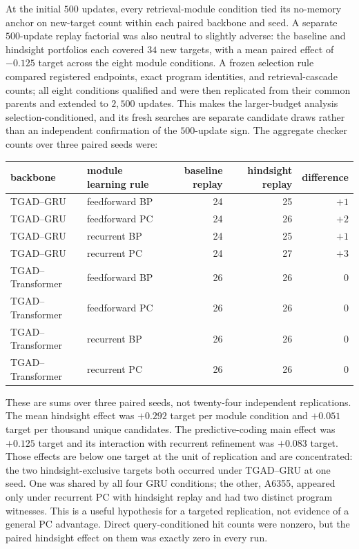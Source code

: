\documentclass[11pt]{article}
\begin{document}
At the initial $500$ updates, every retrieval-module condition tied its no-memory anchor
on new-target count within each paired backbone and seed.  A separate $500$-update replay
factorial was also neutral to slightly adverse: the baseline and hindsight portfolios
each covered $34$ new targets, with a mean paired effect of $-0.125$ target across the
eight module conditions.  A frozen selection rule compared registered endpoints, exact
program identities, and retrieval-cascade counts; all eight conditions qualified and were
then replicated from their common parents and extended to $2{,}500$ updates.  This makes
the larger-budget analysis selection-conditioned, and its fresh searches are separate
candidate draws rather than an independent confirmation of the $500$-update sign.  The
aggregate checker counts over three paired seeds were:

\begin{center}\small
\begin{tabular}{@{}llrrr@{}}
\toprule
backbone & module learning rule & baseline replay & hindsight replay & difference \\
\midrule
TGAD--GRU & feedforward BP & 24 & 25 & $+1$ \\
TGAD--GRU & feedforward PC & 24 & 26 & $+2$ \\
TGAD--GRU & recurrent BP & 24 & 25 & $+1$ \\
TGAD--GRU & recurrent PC & 24 & 27 & $+3$ \\
TGAD--Transformer & feedforward BP & 26 & 26 & $0$ \\
TGAD--Transformer & feedforward PC & 26 & 26 & $0$ \\
TGAD--Transformer & recurrent BP & 26 & 26 & $0$ \\
TGAD--Transformer & recurrent PC & 26 & 26 & $0$ \\
\bottomrule
\end{tabular}
\end{center}

These are sums over three paired seeds, not twenty-four independent replications.  The
mean hindsight effect was $+0.292$ target per module condition and $+0.051$ target per
thousand unique candidates.  The predictive-coding main effect was $+0.125$ target and
its interaction with recurrent refinement was $+0.083$ target.  Those effects are below
one target at the unit of replication and are concentrated: the two hindsight-exclusive
targets both occurred under TGAD--GRU at one seed.  One was shared by all four GRU
conditions; the other, A6355, appeared only under recurrent PC with hindsight replay and
had two distinct program witnesses.  This is a useful hypothesis for a targeted
replication, not evidence of a general PC advantage.  Direct query-conditioned hit counts
were nonzero, but the paired hindsight effect on them was exactly zero in every run.
\end{document}
